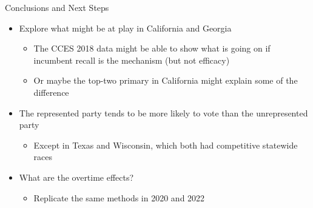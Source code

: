 \documentclass[
  ignorenonframetext,
]{beamer}
\providecommand{\tightlist}{%
  \setlength{\itemsep}{0pt}\setlength{\parskip}{0pt}}
\begin{document}
\begin{frame}{Conclusions and Next Steps}
\protect\hypertarget{conclusions-and-next-steps}{}
\begin{itemize}[<+->]
\tightlist
\item
  Explore what might be at play in California and Georgia

  \begin{itemize}[<+->]
  \tightlist
  \item
    The CCES 2018 data might be able to show what is going on if
    incumbent recall is the mechanism (but not efficacy)
  \item
    Or maybe the top-two primary in California might explain some of the
    difference
  \end{itemize}
\end{itemize}

\begin{itemize}[<+->]
\tightlist
\item
  The represented party tends to be more likely to vote than the
  unrepresented party

  \begin{itemize}[<+->]
  \tightlist
  \item
    Except in Texas and Wisconsin, which both had competitive statewide
    races
  \end{itemize}
\end{itemize}

\begin{itemize}[<+->]
\tightlist
\item
  What are the overtime effects?

  \begin{itemize}[<+->]
  \tightlist
  \item
    Replicate the same methods in 2020 and 2022
  \end{itemize}
\end{itemize}
\end{frame}
\end{document}
